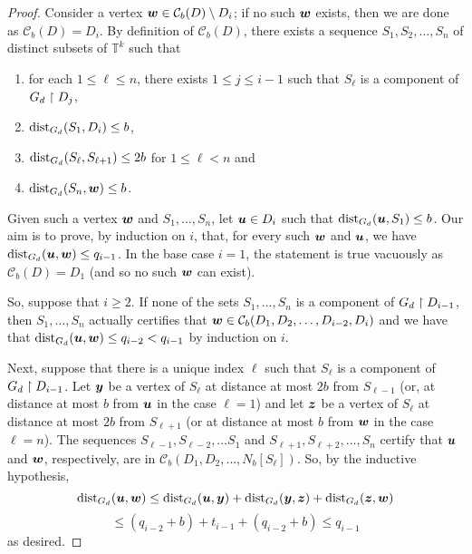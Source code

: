 \documentclass[12pt,a4paper]{amsart}
\numberwithin{equation}{section}
\theoremstyle{definition}
\begin{document}
\begin{proof}
Consider a vertex $\boldsymbol{w}\in \mathcal{C}_b(D)\setminus D_i$; if no such $\boldsymbol{w}$ exists, then we are done as $\mathcal{C}_b(D)=D_i$. By definition of $\mathcal{C}_b(D)$, there exists a sequence $S_1,S_2,\dots,S_n$ of distinct subsets of $\mathbb{T}^k$ such that
\begin{enumerate}
\item for each $1\leq \ell\leq n$, there exists $1\leq j\leq i-1$ such that $S_\ell$ is a component of $G_d\upharpoonright D_j$,
\item $\operatorname{dist}_{G_d}(S_1,D_i)\leq b$,
\item $\operatorname{dist}_{G_d}(S_\ell,S_{\ell+1})\leq 2b$ for $1\leq \ell < n$ and
\item $\operatorname{dist}_{G_d}(S_n,\boldsymbol{w})\leq b$. 
\end{enumerate}
Given such a vertex $\boldsymbol{w}$ and $S_1,\dots,S_n$, let $\boldsymbol{u}\in D_i$ such that $\operatorname{dist}_{G_d}(\boldsymbol{u},S_1)\leq b$. Our aim is to prove, by induction on $i$, that, for every such $\boldsymbol{w}$ and $\boldsymbol{u}$, we have $\operatorname{dist}_{G_d}(\boldsymbol{u},\boldsymbol{w})\leq q_{i-1}$. In the base case $i=1$, the statement is true vacuously as $\mathcal{C}_b(D)=D_1$ (and so no such $\boldsymbol{w}$ can exist). 

So, suppose that $i\geq2$. If none of the sets $S_1,\dots,S_n$ is a component of $G_d\upharpoonright D_{i-1}$, then $S_1,\dots,S_n$ actually certifies that $\boldsymbol{w}\in \mathcal{C}_b(D_1,D_2,\dots,D_{i-2},D_i)$ and we have that $\operatorname{dist}_{G_d}(\boldsymbol{u},\boldsymbol{w})\leq q_{i-2}<q_{i-1}$ by induction on $i$. 

Next, suppose that there is a unique index $\ell$ such that $S_\ell$ is a component of $G_d\upharpoonright D_{i-1}$. Let $\boldsymbol{y}$ be a vertex of $S_\ell$ at distance at most $2b$ from $S_{\ell-1}$ (or, at distance at most $b$ from $\boldsymbol{u}$ in the case $\ell=1$) and let $\boldsymbol{z}$ be a vertex of $S_\ell$ at distance at most $2b$ from $S_{\ell+1}$ (or at distance at most $b$ from $\boldsymbol{w}$ in the case $\ell=n$). The sequences $S_{\ell-1},S_{\ell-2},\dots S_1$ and $S_{\ell+1},S_{\ell+2},\dots, S_n$ certify that $\boldsymbol{u}$ and $\boldsymbol{w}$, respectively, are in $\mathcal{C}_b(D_1,D_2,\dots, N_b[S_\ell])$. So, by the inductive hypothesis,
\[\operatorname{dist}_{G_d}(\boldsymbol{u},\boldsymbol{w})\leq \operatorname{dist}_{G_d}(\boldsymbol{u},\boldsymbol{y})+\operatorname{dist}_{G_d}(\boldsymbol{y},\boldsymbol{z})+\operatorname{dist}_{G_d}(\boldsymbol{z},\boldsymbol{w})\]
\[\leq \left(q_{i-2} +b\right)+ t_{i-1} + \left(q_{i-2} +b\right)\leq q_{i-1}\]
as desired.


\end{proof}
\end{document}
